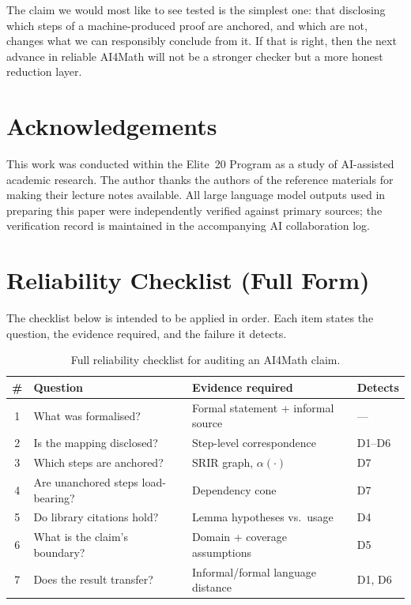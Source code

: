\documentclass[11pt,a4paper]{article}
\theoremstyle{definition}
\theoremstyle{plain}
\theoremstyle{remark}
\begin{document}
The claim we would most like to see tested is the simplest one: that
disclosing which steps of a machine-produced proof are anchored, and which are
not, changes what we can responsibly conclude from it. If that is right, then
the next advance in reliable AI4Math will not be a stronger checker but a more
honest reduction layer.

\section*{Acknowledgements}

This work was conducted within the Elite~20 Program as a study of AI-assisted
academic research. The author thanks the authors of the reference materials for
making their lecture notes available. All large language model outputs used in
preparing this paper were independently verified against primary sources; the
verification record is maintained in the accompanying AI collaboration log.




\appendix

\section{Reliability Checklist (Full Form)}
\label{app:checklist}

The checklist below is intended to be applied in order. Each item states the
question, the evidence required, and the failure it detects.

\begin{table}[h]
\centering
\small
\caption{Full reliability checklist for auditing an AI4Math claim.}
\label{tab:checklist-full}
\begin{tabularx}{\textwidth}{@{}c l X l@{}}
\toprule
\textbf{\#} & \textbf{Question} & \textbf{Evidence required} & \textbf{Detects} \\
\midrule
1 & What was formalised? & Formal statement + informal source & --- \\
2 & Is the mapping disclosed? & Step-level correspondence & D1--D6 \\
3 & Which steps are anchored? & SRIR graph, $\alpha(\cdot)$ & D7 \\
4 & Are unanchored steps load-bearing? & Dependency cone & D7 \\
5 & Do library citations hold? & Lemma hypotheses vs.\ usage & D4 \\
6 & What is the claim's boundary? & Domain + coverage assumptions & D5 \\
7 & Does the result transfer? & Informal/formal language distance & D1, D6 \\
\bottomrule
\end{tabularx}
\end{table}
\end{document}
